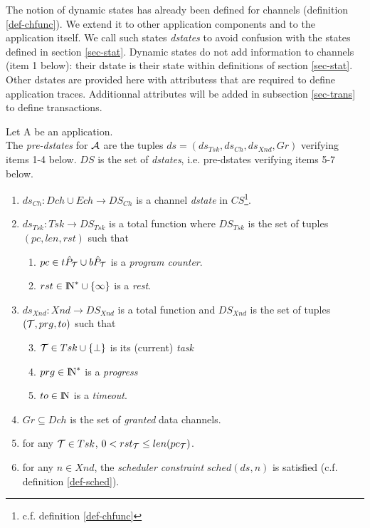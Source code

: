 \documentclass{article}
\newcommand{\NAT}{\mbox{\normalfont I$\!$N}}
\begin{document}
The notion of dynamic states has already been defined for channels (definition \ref{def-chfunc}). We extend it to other application components and to the application itself. We call such states {\em dstates} to avoid confusion with the states defined in section \ref{sec-stat}. Dynamic states do not add information to channels (item 1 below): their dstate is their state within definitions of section \ref{sec-stat}. Other dstates are provided here with attributess that are required to define application traces. Additionnal attributes will be added in subsection \ref{sec-trans} to define transactions.
\begin{definition}[dstates]\label{def-dst} Let {\cal A} be an application.\\  The {\em pre-dstates} for ${\cal A}$ are the tuples $ds=(ds_{Tsk},ds_{Ch},ds_{X\!nd},Gr)$ verifying items 1-4 below. $DS$ is the set of {\em dstates}, i.e. pre-dstates verifying items 5-7 below.
\begin{enumerate}
\item $ds_{Ch}:Dch\cup Ech\rightarrow DS_{Ch}$ is a channel {\em dstate} in $CS$\footnote{c.f. definition \ref{def-chfunc}}.
\item $ds_{Tsk}:Tsk\rightarrow DS_{Tsk}$ is a total function where $DS_{Tsk}$ is the set of tuples $(pc,len,rst)$ such that
   \begin{enumerate}
	 \item $pc\in t\hat P_{\cal T}\cup b\hat P_{\cal T}$ is a {\em program counter}.
	 \item $rst\in\NAT^*\cup\{\infty\}$ is a {\em rest}.
	 \end{enumerate}
\item $ds_{X\!nd}:X\!nd\rightarrow DS_{X\!nd}$ is a total function and $DS_{X\!nd}$ is the set of tuples $({\cal T},prg,to)$ such that
   \begin{enumerate}\setcounter{enumii}{2}
   \item ${\cal T}\in Tsk\cup\{\bot\}$ is its (current) {\em task}
	 \item $prg\in\NAT^*$ is a {\em progress}
	 \item $to\in\NAT$ is a {\em timeout}.
   \end{enumerate}
\item $Gr\subseteq Dch$ is the set of {\em granted} data channels.
\item for any ${\cal T}\in Tsk$, $0<rst_{\cal T}\leq len(pc_{\cal T})$.
\item for any $n\in X\!nd$, the {\em scheduler constraint} $sched(ds,n)$ is satisfied (c.f. definition \ref{def-sched}).

\end{enumerate}
\end{definition}
\end{document}
